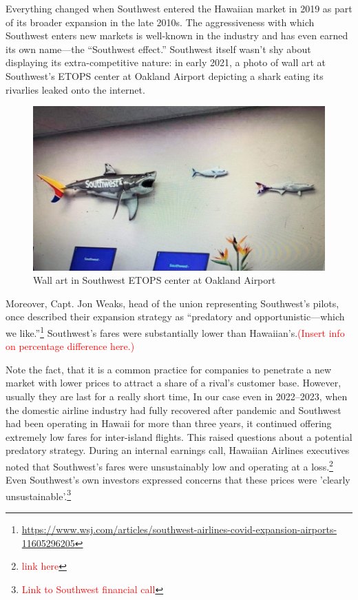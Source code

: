 \documentclass[12pt,oneside]{article}
\theoremstyle{definition}
\theoremstyle{remark}
\begin{document}
Everything changed when Southwest entered the Hawaiian market in 2019 as part of its broader expansion in the late 2010s. The aggressiveness with which Southwest enters new markets is well-known in the industry and has even earned its own name—the “Southwest effect.” Southwest itself wasn’t shy about displaying its extra-competitive nature: in early 2021, a photo of wall art at Southwest’s ETOPS center at Oakland Airport depicting a shark eating its rivarlies leaked onto the internet.
\begin{figure}[H]
  \centering
  \includegraphics[scale=0.5]{plots_and_pictures/southwest-shark_900x506x1440-810-0-135.jpg}
  \caption{Wall art in Southwest ETOPS center at Oakland Airport}
\end{figure}
 Moreover, Capt. Jon Weaks, head of the union representing Southwest’s pilots, once described their expansion strategy as “predatory and opportunistic—which we like.”\footnote{\href{https://www.wsj.com/articles/southwest-airlines-covid-expansion-airports-11605296205}{https://www.wsj.com/articles/southwest-airlines-covid-expansion-airports-11605296205}} Southwest’s fares were substantially lower than Hawaiian’s.\textcolor{red}{(Insert info on percentage difference here.)}
 
 Note the fact, that it is a common practice for companies to penetrate a new market with lower prices to attract a share of a rival’s customer base. However, usually they are last for a really short time, In our case even in 2022–2023, when the domestic airline industry had fully recovered after pandemic and Southwest had been operating in Hawaii for more than three years, it continued offering extremely low fares for inter-island flights. This raised questions about a potential predatory strategy. During an internal earnings call, Hawaiian Airlines executives noted that Southwest’s fares were unsustainably low and operating at a loss.\footnote{\textcolor{red}{link here}} Even Southwest’s own investors expressed concerns that these prices were 'clearly unsustainable'.\footnote{\textcolor{red}{Link to Southwest financial call}}
\end{document}
